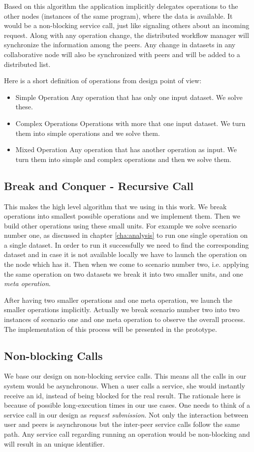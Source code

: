 Based on this algorithm the application implicitly delegates operations to the other 
nodes (instances of the same program), where the data is available. 
It would be a non-blocking service call, 
just like signaling others about an incoming request.
Along with any operation change, the distributed workflow manager will synchronize the information among the peers.
Any change in datasets in any collaborative node will also be synchronized with peers and will be added to 
a distributed list.

Here is a short definition of operations from design point of view:

\begin{itemize}
\item{Simple Operation} Any operation that has only one input dataset. We solve these.
\item{Complex Operations} Operations with more that one input dataset. We turn them into simple operations and we solve them.
\item{Mixed Operation} Any operation that has another operation as input. We turn them into simple and complex operations and
then we solve them.
\end{itemize}

\subsection{Break and Conquer - Recursive Call}
This makes the high level algorithm that we using in this work. We break operations into smallest possible operations
and we implement them. Then we build other operations using these small units. For example we solve scenario number one, as
discussed in chapter \ref{cha:analysis} to run one single operation on a single dataset.
In order to run it successfully we need to find the corresponding dataset and in case it is not available locally we have
to launch the operation on the node which has it. Then when we come to scenario number two, i.e. applying the same operation
on two datasets we break it into two smaller units, and one \textit{meta operation}.

After having two smaller operations and one meta operation, we launch the smaller operations implicitly. Actually we break
scenario number two into two instances of scenario one and one meta operation to observe the overall process. The implementation
of this process will be presented in the prototype.

\subsection{Non-blocking Calls}
We base our design on non-blocking service calls. This means all the calls in our system would be asynchronous.
When a user calls a service, she would instantly receive an id, instead of being blocked for the real result.
The rationale here is because of possible long-execution times in our use cases. 
One needs to think of a service call in our design as \textit{request submission}. 
Not only the interaction between user and peers is asynchronous but the inter-peer service calls follow the same path.
Any service call regarding running an operation would be non-blocking and will result in an unique identifier.


